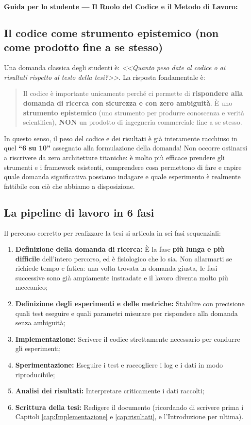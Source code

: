 \textbf{Guida per lo studente — Il Ruolo del Codice e il Metodo di Lavoro:}

\subsection*{Il codice come strumento epistemico (non come prodotto fine a se stesso)}
Una domanda classica degli studenti è: \emph{<<Quanto peso date al codice o ai risultati rispetto al testo della tesi?>>}.
La risposta fondamentale è:
\begin{quote}
Il codice è importante unicamente perché ci permette di \textbf{rispondere alla domanda di ricerca con sicurezza e con zero ambiguità}. 
È uno \textbf{strumento epistemico} (uno strumento per produrre conoscenza e verità scientifica), \textbf{NON} un prodotto di ingegneria commerciale fine a se stesso.
\end{quote}
In questo senso, il peso del codice e dei risultati è già interamente racchiuso in quel \textbf{``6 su 10''} assegnato alla formulazione della domanda! Non occorre ostinarsi a riscrivere da zero architetture titaniche: è molto più efficace prendere gli strumenti e i framework esistenti, comprendere cosa permettono di fare e capire quale domanda significativa possiamo indagare e quale esperimento è realmente fattibile con ciò che abbiamo a disposizione.

\subsection*{La pipeline di lavoro in 6 fasi}
Il percorso corretto per realizzare la tesi si articola in sei fasi sequenziali:
\begin{enumerate}
    \item \textbf{Definizione della domanda di ricerca:} È la fase \textbf{più lunga e più difficile} dell'intero percorso, ed è fisiologico che lo sia. Non allarmarti se richiede tempo e fatica: una volta trovata la domanda giusta, le fasi successive sono già ampiamente instradate e il lavoro diventa molto più meccanico;
    \item \textbf{Definizione degli esperimenti e delle metriche:} Stabilire con precisione quali test eseguire e quali parametri misurare per rispondere alla domanda senza ambiguità;
    \item \textbf{Implementazione:} Scrivere il codice strettamente necessario per condurre gli esperimenti;
    \item \textbf{Sperimentazione:} Eseguire i test e raccogliere i log e i dati in modo riproducibile;
    \item \textbf{Analisi dei risultati:} Interpretare criticamente i dati raccolti;
    \item \textbf{Scrittura della tesi:} Redigere il documento (ricordando di scrivere prima i Capitoli \ref{cap:Implementazione} e \ref{cap:risultati}, e l'Introduzione per ultima).
\end{enumerate}

